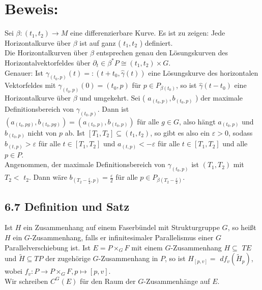 \section*{Beweis:}
Sei $\beta:\left(t_{1}, t_{2}\right) \rightarrow M$ eine differenzierbare Kurve. Es ist zu zeigen: Jede Horizontalkurve über $\beta$ ist auf ganz ( $t_{1}, t_{2}$ ) definiert.\\
Die Horizontalkurven über $\beta$ entsprechen genau den Lösungskurven des Horizontalvektorfeldes über $\partial_{t} \in \beta^{*} P \cong\left(t_{1}, t_{2}\right) \times G$.\\
Genauer: Ist $\gamma_{\left(t_{0}, p\right)}(t)=:\left(t+t_{0}, \hat{\gamma}(t)\right)$ eine Lösungskurve des horizontalen Vektorfeldes mit $\gamma_{\left(t_{0}, p\right)}(0)=\left(t_{0}, p\right)$ für $p \in P_{\beta\left(t_{0}\right)}$, so ist $\hat{\gamma}\left(t-t_{0}\right)$ eine Horizontalkurve über $\beta$ und umgekehrt. Sei ( $a_{\left(t_{0}, p\right)}, b_{\left(t_{0}, p\right)}$ ) der maximale Definitionsbereich von $\gamma_{\left(t_{0}, p\right)}$. Dann ist $\left(a_{\left(t_{0}, p g\right)}, b_{\left(t_{0}, p g\right)}\right)=\left(a_{\left(t_{0}, p\right)}, b_{\left(t_{0}, p\right)}\right)$ für alle $g \in G$, also hängt $a_{\left(t_{0}, p\right)}$ und $b_{\left(t_{0}, p\right)}$ nicht von $p$ ab. Ist $\left[T_{1}, T_{2}\right] \subseteq\left(t_{1}, t_{2}\right)$, so gibt es also ein $\varepsilon>0$, sodass $b_{(t, p)}>\varepsilon$ für alle $t \in\left[T_{1}, T_{2}\right]$ und $a_{(t, p)}<-\varepsilon$ für alle $t \in\left[T_{1}, T_{2}\right]$ und alle $p \in P$.\\
Angenommen, der maximale Definitionsbereich von $\gamma_{\left(t_{0}, p\right)}$ ist $\left(T_{1}, T_{2}\right)$ mit $T_{2}<$ $t_{2}$. Dann wäre $b_{\left(T_{2}-\frac{\varepsilon}{2}, p\right)}=\frac{\varepsilon}{2}$ für alle $p \in P_{\beta\left(T_{2}-\frac{\varepsilon}{2}\right)}$.

\subsection*{6.7 Definition und Satz}
Ist $H$ ein Zusammenhang auf einem Faserbündel mit Strukturgruppe $G$, so heißt $H$ ein $G$-Zusammenhang, falls er infinitesimaler Parallelismus einer $G$ Parallelverschiebung ist. Ist $E=P \times_{G} F$ mit einem $G$-Zusammenhang $H \subseteq$ $T E$ und $\tilde{H} \subseteq T P$ der zugehörige $G$-Zusammenhang in $P$, so ist $H_{[p, v]}=$ $d f_{v}\left(\tilde{H}_{p}\right)$, wobei $f_{v}: P \rightarrow P \times_{G} F, p \mapsto[p, v]$.\\
Wir schreiben $C^{G}(E)$ für den Raum der $G$-Zusammenhänge auf $E$.

